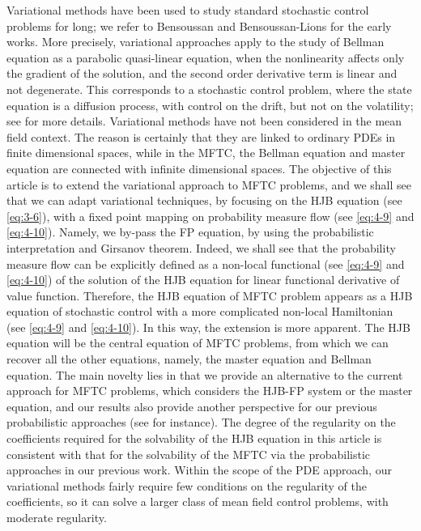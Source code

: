 \documentclass[11pt]{article}
\numberwithin{equation}{section}
\newcommand{\1}{\mbox{1\hspace{-1mm}I}}
\begin{document}
Variational methods have been used to study standard stochastic control problems for long; we refer to Bensoussan \cite{1} and Bensoussan-Lions \cite{2} for the early works. More precisely, variational approaches apply to the study of Bellman equation as a parabolic quasi-linear equation, when the nonlinearity affects only the gradient of the solution, and the second order derivative term is linear and not degenerate. This corresponds to a stochastic control problem, where the state equation is a diffusion process, with control on the drift, but not on the volatility; see \cite{3} for more details. Variational methods have not been considered in the mean field context. The reason is certainly that they are linked to ordinary PDEs in finite dimensional spaces, while in the MFTC, the Bellman equation and master equation are connected with infinite dimensional spaces. The objective of this article is to extend the variational approach to MFTC problems, and we shall see that we can adapt variational techniques, by focusing on the HJB equation (see \eqref{eq:3-6}), with a fixed point mapping on probability measure flow (see \eqref{eq:4-9} and \eqref{eq:4-10}). Namely, we by-pass the FP equation, by using the probabilistic interpretation and Girsanov theorem. Indeed, we shall see that the probability measure flow can be explicitly defined as a non-local functional (see \eqref{eq:4-9} and \eqref{eq:4-10}) of the solution of the HJB equation for linear functional derivative of value function. Therefore, the HJB equation of MFTC problem appears as a HJB equation of stochastic control with a more complicated non-local Hamiltonian (see \eqref{eq:4-9} and \eqref{eq:4-10}). In this way, the extension is more apparent. The HJB equation will be the central equation of MFTC problems, from which we can recover all the other equations, namely, the master equation and Bellman equation. The main novelty lies in that we provide an alternative to the current approach for MFTC problems, which considers the HJB-FP system or the master equation, and our results also provide another perspective for our previous probabilistic approaches (see \cite{AB10,AB5,AB10''} for instance). The degree of the regularity on the coefficients required for the solvability of the HJB equation in this article is consistent with that for the solvability of the MFTC via the probabilistic approaches in our previous work. Within the scope of the PDE approach, our variational methods fairly require few conditions on the regularity of the coefficients, so it can solve a larger class of mean field control problems, with moderate regularity.
\end{document}
